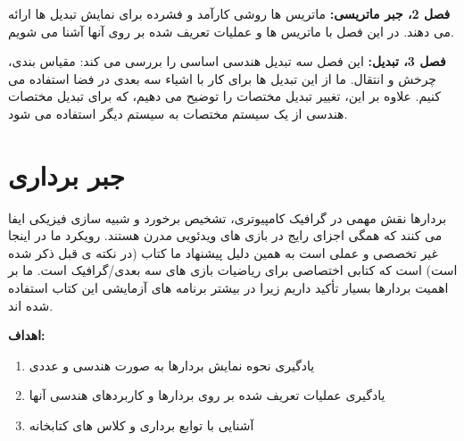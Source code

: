 {\begin{spacing}{1.5}
        \textbf{فصل 2، جبر ماتریسی:} ماتریس ها روشی کارآمد و فشرده برای نمایش تبدیل ها ارائه می دهند.
        در این فصل با ماتریس ها و عملیات تعریف شده بر روی آنها آشنا می شویم.

        \textbf{فصل 3، تبدیل:} این فصل سه تبدیل هندسی اساسی را بررسی می کند: مقیاس بندی، چرخش و انتقال.
        ما از این تبدیل ها برای کار با اشیاء سه بعدی در فضا استفاده می کنیم.
        علاوه بر این، تغییر تبدیل مختصات را توضیح می دهیم، که برای تبدیل مختصات هندسی از یک سیستم مختصات به سیستم دیگر استفاده می شود.
    \end{spacing}
}

\setcounter{chapter}{1}

\textbf{\vspace{80pt}}
\chapter{\textbf{جبر برداری}}
\textbf{\vspace{70pt}}
{
    \Large
    \begin{spacing}{1.5}
        بردارها نقش مهمی در گرافیک کامپیوتری، تشخیص برخورد و شبیه سازی فیزیکی ایفا می کنند که همگی اجزای رایج در بازی های ویدئویی مدرن هستند.
        رویکرد ما در اینجا غیر تخصصی و عملی است به همین دلیل پیشنهاد ما کتاب  (در نکته ی قبل ذکر شده است) است که کتابی اختصاصی برای ریاضیات بازی های سه بعدی/گرافیک است.
        ما بر اهمیت بردارها بسیار تأکید داریم زیرا در بیشتر برنامه های آزمایشی این کتاب استفاده شده اند.

        \textbf{\vspace{20pt}}
        \textbf{\hspace{-40pt}\LARGE اهداف:}

        \begin{enumerate}
            \item {یادگیری نحوه نمایش بردارها به صورت هندسی و عددی}
            \item {یادگیری عملیات تعریف شده بر روی بردارها و کاربردهای هندسی آنها}
            \item {آشنایی با توابع برداری و کلاس های کتابخانه }
        \end{enumerate}
    \end{spacing}
}
\newpage

